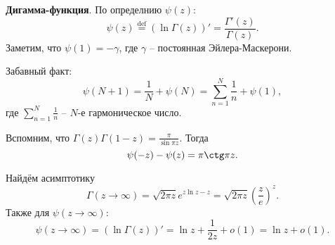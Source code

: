 \textbf{Дигамма-функция}. По определнию $\psi(z)$:
\begin{equation*}
    \psi(z) \overset{\mathrm{def}}{=}  \left(\ln \Gamma(z)\right)' = \frac{\Gamma'(z)}{\Gamma(z)}.
\end{equation*}
Заметим, что $\psi(1) = - \gamma$, где $\gamma$ -- постоянная Эйлера-Маскерони. 

Забавный факт:
\begin{equation*}
    \psi(N+1) = \frac{1}{N} + \psi(N) = \sum_{n=1}^{N} \frac{1}{n} + \psi(1),
\end{equation*}
где $\sum_{n=1}^{N} \frac{1}{n}$ -- $N$-е гармоническое число. 

Вспомним, что $\Gamma(z) \Gamma(1-z) = \frac{\pi}{\sin \pi z}$. Тогда
\begin{equation*}
    \psi(-z) - \psi(z) = \pi \ctg \pi z.
\end{equation*}

Найдём асимптотику 
\begin{equation*}
    \Gamma(z \to \infty) = \sqrt{2 \pi z} e^{z \ln z - z} = \sqrt{2 \pi z} \left(\frac{z}{e}\right)^{z}.
\end{equation*}
Также для $\psi(z\to \infty)$:
\begin{equation*}
    \psi(z\to \infty) = \left(\ln \Gamma(z)\right)' = \ln z + \frac{1}{2z} + o(1) = \ln z + o(1).
\end{equation*}
